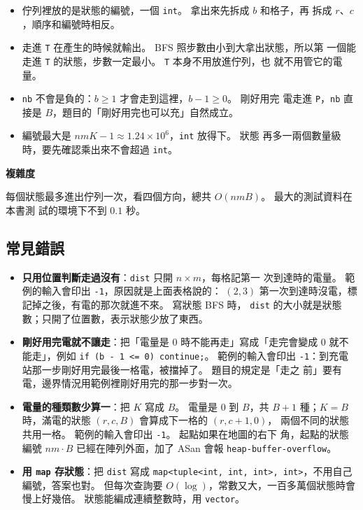 \begin{itemize}
\item 佇列裡放的是狀態的編號，一個 \texttt{int}。 拿出來先拆成 $b$ 和格子，再
拆成 $r$、$c$，順序和編號時相反。
\item 走進 \texttt{T} 在產生的時候就輸出。 BFS 照步數由小到大拿出狀態，所以第
一個能走進 \texttt{T} 的狀態，步數一定最小。 \texttt{T} 本身不用放進佇列，也
就不用管它的電量。
\item \texttt{nb} 不會是負的：$b \ge 1$ 才會走到這裡，$b - 1 \ge 0$。 剛好用完
電走進 \texttt{P}，\texttt{nb} 直接是 $B$，題目的「剛好用完也可以充」自然成立。
\item 編號最大是 $nmK - 1 \approx 1.24 \times 10^6$，\texttt{int} 放得下。 狀態
再多一兩個數量級時，要先確認乘出來不會超過 \texttt{int}。
\end{itemize}

\textbf{複雜度}

每個狀態最多進出佇列一次，看四個方向，總共 $O(nmB)$。 最大的測試資料在本書測
試的環境下不到 $0.1$ 秒。

\subsection{常見錯誤}

\begin{itemize}
\item \textbf{只用位置判斷走過沒有}：\texttt{dist} 只開 $n \times m$，每格記第一
次到達時的電量。 範例的輸入會印出 \texttt{-1}，原因就是上面表格說的：
$(2, 3)$ 第一次到達時沒電，標記掉之後，有電的那次就進不來。 寫狀態 BFS 時，
\texttt{dist} 的大小就是狀態數；只開了位置數，表示狀態少放了東西。
\item \textbf{剛好用完電就不讓走}：把「電量是 $0$ 時不能再走」寫成「走完會變成
$0$ 就不能走」，例如 \texttt{if (b - 1 <= 0) continue;}。 範例的輸入會印出
\texttt{-1}：到充電站那一步剛好用完最後一格電，被擋掉了。 題目的規定是「走之
前」要有電，邊界情況用範例裡剛好用完的那一步對一次。
\item \textbf{電量的種類數少算一}：把 $K$ 寫成 $B$。 電量是 $0$ 到 $B$，共
$B + 1$ 種；$K = B$ 時，滿電的狀態 $(r, c, B)$ 會算成下一格的 $(r, c + 1, 0)$，
兩個不同的狀態共用一格。 範例的輸入會印出 \texttt{-1}。 起點如果在地圖的右下
角，起點的狀態編號 $nm \cdot B$ 已經在陣列外面，加了 ASan 會報
\texttt{heap-buffer-overflow}。
\item \textbf{用 \texttt{map} 存狀態}：把 \texttt{dist} 寫成
\texttt{map<tuple<int, int, int>, int>}，不用自己編號，答案也對。 但每次查詢要
$O(\log)$，常數又大，一百多萬個狀態時會慢上好幾倍。 狀態能編成連續整數時，用
\texttt{vector}。
\end{itemize}

